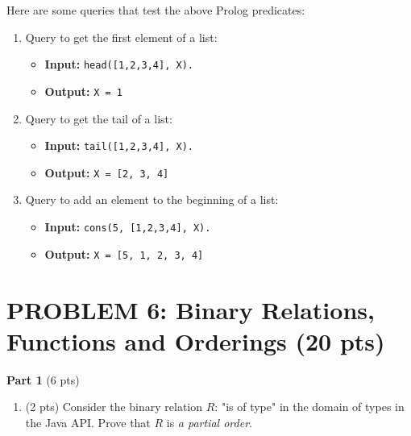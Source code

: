 \documentclass[12pt]{article}
\begin{document}
\begin{spacing}{1.5}
\begin{enumerate}
		      Here are some queries that test the above Prolog predicates:
		      		      		      
		      \begin{enumerate}
		      	\item Query to get the first element of a list:
		      	      \begin{itemize}
		      	      	\item \textbf{Input:} \texttt{head([1,2,3,4], X).}
		      	      	\item \textbf{Output:} \texttt{X = 1} 
		      	      \end{itemize}
		      	      		      	      		      	      
		      	\item Query to get the tail of a list:
		      	      \begin{itemize}
		      	      	\item \textbf{Input:} \texttt{tail([1,2,3,4], X).}
		      	      	\item \textbf{Output:} \texttt{X = [2, 3, 4]} 
		      	      \end{itemize}
		      	      		      	      		      	      
		      	\item Query to add an element to the beginning of a list:
		      	      \begin{itemize}
		      	      	\item \textbf{Input:} \texttt{cons(5, [1,2,3,4], X).}
		      	      	\item \textbf{Output:} \texttt{X = [5, 1, 2, 3, 4]} 
		      	      \end{itemize}
		      \end{enumerate}
		      		      		      		      
	\end{enumerate}
				     
	\newpage
	\section*{PROBLEM 6: Binary Relations, Functions and Orderings (20 pts)}
			
	\textbf{Part 1} (6 pts)
			
	\begin{enumerate}
		\item (2 pts) Consider the binary relation $R$: "is of type" in the domain of types in the Java API. Prove that $R$ is \textit{a partial order}.
		      		      		      

\end{enumerate}
\end{spacing}
\end{document}
